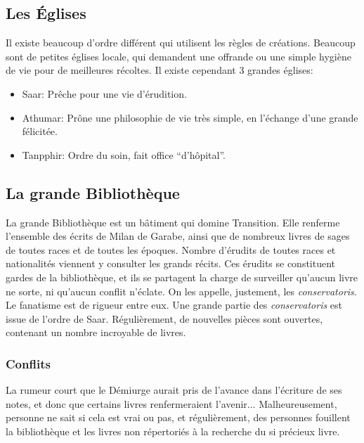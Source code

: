\subsection{Les Églises}
Il existe beaucoup d'ordre différent qui utilisent les règles de créations. Beaucoup sont de petites églises locale, qui demandent une offrande ou une simple hygiène de vie pour de meilleures récoltes.
Il existe cependant 3 grandes églises:
\begin{itemize}
\item Saar: Prêche pour une vie d'érudition.
\item Athumar: Prône une philosophie de vie très simple, en l'échange d'une grande félicitée.
\item Tanpphir: Ordre du soin, fait office “d'hôpital”.
\end{itemize} 
\subsection{La grande Bibliothèque}
\hypertarget{bibliotheque}{}
La grande Bibliothèque est un bâtiment qui domine Transition. Elle renferme l'ensemble des écrits de Milan de Garabe, ainsi que de nombreux livres de sages de toutes races et de toutes les époques.
Nombre d'érudits de toutes races et nationalités viennent y consulter les grands récits.
\newline
Ces érudits se constituent gardes de la bibliothèque, et ils se partagent la charge de surveiller qu'aucun livre ne sorte, ni qu'aucun conflit n'éclate. On les appelle, justement, les \textit{conservatoris}. Le fanatisme est de rigueur entre eux. Une grande partie des \textit{conservatoris} est issue de l'ordre de Saar. 
\newline
Régulièrement, de nouvelles pièces sont ouvertes, contenant un nombre incroyable de livres.
\subsubsection{Conflits}
La rumeur court que le Démiurge aurait pris de l'avance dans l'écriture de ses notes, et donc que certains livres renfermeraient l'avenir... Malheureusement, personne ne sait si cela est vrai ou pas, et régulièrement, des personnes fouillent la bibliothèque et les livres non répertoriés à la recherche du si précieux livre.